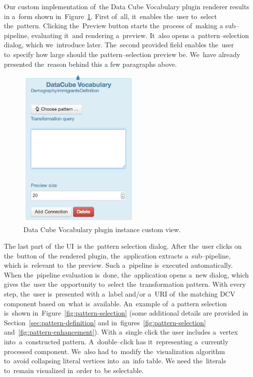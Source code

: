 Our custom implementation of~the Data Cube Vocabulary plugin renderer results 
in a~form shown in~Figure~\ref{fig:DCV-plugin-view}. First of~all, it~enables the~user to~select the~pattern. Clicking the~Preview button starts the~process of~making a
sub--pipeline, evaluating it~and rendering a~preview. It~also opens a~pattern--selection
dialog, which we~introduce later. The~second provided field enables the~user to~specify how large should 
the pattern--selection preview be. We~have already presented the~reason behind this 
a few paragraphs above.

\begin{figure}
	\centering
	\includegraphics[width=60mm]{img/custom-dcv-piv.png}
	\caption{Data Cube Vocabulary plugin instance custom view.}
	\label{fig:DCV-plugin-view}
\end{figure}

The last part of~the UI~is the~pattern selection dialog. After the~user clicks 
on the~button of~the rendered plugin, the~application extracts a~sub--pipeline, 
which is~relevant to~the preview. Such a~pipeline is~executed
automatically. When the~pipeline evaluation is~done, the~application opens a~new 
dialog, which gives the~user the~opportunity to~select the~transformation 
pattern. With every step, the~user is~presented with a~label and/or a~URI of~the 
matching DCV component based on~what is~available. An~example of~a pattern 
selection is~shown in~Figure~\ref{fig:pattern-selection} (some additional details are provided
in Section~\ref{sec:pattern-definition}
and in~figures~\ref{fig:pattern-selection} and~\ref{fig:pattern-enhancement}).
With a~single click 
the user includes a~vertex into~a~constructed pattern. A~double--click 
has it~representing a~currently processed component. We~also had to~modify the~visualization algorithm to~avoid collapsing literal vertices into~an~info table. 
We need the~literals to~remain visualized in~order to~be selectable.

